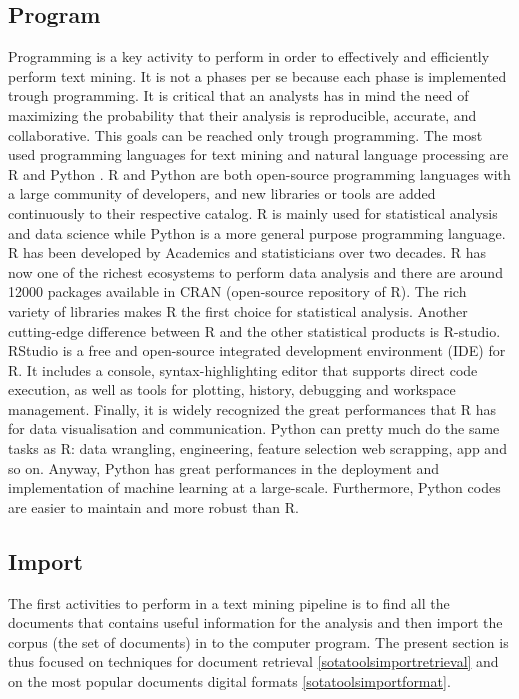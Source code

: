 \documentclass[]{book}
\begin{document}
\subsection{Program}\label{sotatoolsprogram}

Programming is a key activity to perform in order to effectively and
efficiently perform text mining. It is not a phases per se because each
phase is implemented trough programming. It is critical that an analysts
has in mind the need of maximizing the probability that their analysis
is reproducible, accurate, and collaborative. This goals can be reached
only trough programming. The most used programming languages for text
mining and natural language processing are R \citep{r2008} and Python
\citep{py95}. R and Python are both open-source programming languages
with a large community of developers, and new libraries or tools are
added continuously to their respective catalog. R is mainly used for
statistical analysis and data science while Python is a more general
purpose programming language. R has been developed by Academics and
statisticians over two decades. R has now one of the richest ecosystems
to perform data analysis and there are around 12000 packages available
in CRAN (open-source repository of R). The rich variety of libraries
makes R the first choice for statistical analysis. Another cutting-edge
difference between R and the other statistical products is R-studio.
RStudio is a free and open-source integrated development environment
(IDE) for R. It includes a console, syntax-highlighting editor that
supports direct code execution, as well as tools for plotting, history,
debugging and workspace management. Finally, it is widely recognized the
great performances that R has for data visualisation and communication.
Python can pretty much do the same tasks as R: data wrangling,
engineering, feature selection web scrapping, app and so on. Anyway,
Python has great performances in the deployment and implementation of
machine learning at a large-scale. Furthermore, Python codes are easier
to maintain and more robust than R.

\subsection{Import}\label{sotatoolsimport}

The first activities to perform in a text mining pipeline is to find all
the documents that contains useful information for the analysis and then
import the corpus (the set of documents) in to the computer program. The
present section is thus focused on techniques for document retrieval
\ref{sotatoolsimportretrieval} and on the most popular documents digital
formats \ref{sotatoolsimportformat}.
\end{document}
